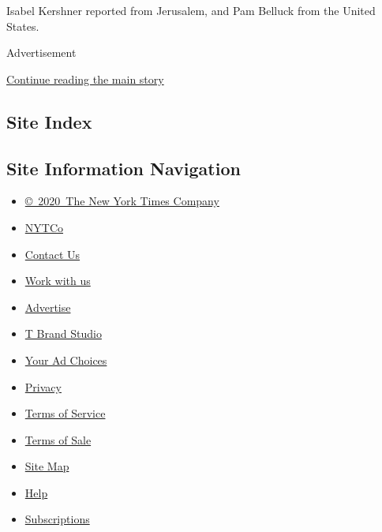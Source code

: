 Isabel Kershner reported from Jerusalem, and Pam Belluck from the United
States.

Advertisement

\protect\hyperlink{after-bottom}{Continue reading the main story}

\hypertarget{site-index}{%
\subsection{Site Index}\label{site-index}}

\hypertarget{site-information-navigation}{%
\subsection{Site Information
Navigation}\label{site-information-navigation}}

\begin{itemize}
\tightlist
\item
  \href{https://help.nytimes.com/hc/en-us/articles/115014792127-Copyright-notice}{©~2020~The
  New York Times Company}
\end{itemize}

\begin{itemize}
\tightlist
\item
  \href{https://www.nytco.com/}{NYTCo}
\item
  \href{https://help.nytimes.com/hc/en-us/articles/115015385887-Contact-Us}{Contact
  Us}
\item
  \href{https://www.nytco.com/careers/}{Work with us}
\item
  \href{https://nytmediakit.com/}{Advertise}
\item
  \href{http://www.tbrandstudio.com/}{T Brand Studio}
\item
  \href{https://www.nytimes.com/privacy/cookie-policy\#how-do-i-manage-trackers}{Your
  Ad Choices}
\item
  \href{https://www.nytimes.com/privacy}{Privacy}
\item
  \href{https://help.nytimes.com/hc/en-us/articles/115014893428-Terms-of-service}{Terms
  of Service}
\item
  \href{https://help.nytimes.com/hc/en-us/articles/115014893968-Terms-of-sale}{Terms
  of Sale}
\item
  \href{https://spiderbites.nytimes.com}{Site Map}
\item
  \href{https://help.nytimes.com/hc/en-us}{Help}
\item
  \href{https://www.nytimes.com/subscription?campaignId=37WXW}{Subscriptions}
\end{itemize}

